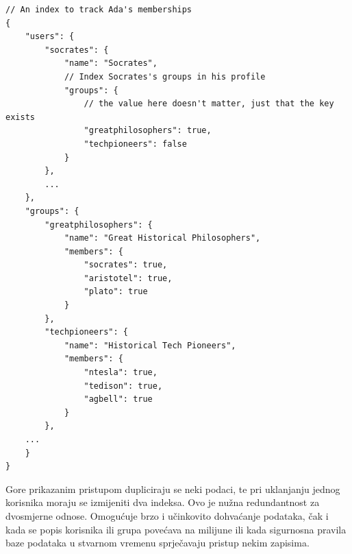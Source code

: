 \begin{lstlisting}[caption={Primjer kreiranja dva indeksa}]
// An index to track Ada's memberships
{
	"users": {
		"socrates": {
			"name": "Socrates",
			// Index Socrates's groups in his profile
			"groups": {
				// the value here doesn't matter, just that the key exists
				"greatphilosophers": true,
				"techpioneers": false
			}
		},
		...
	},
	"groups": {
		"greatphilosophers": {
			"name": "Great Historical Philosophers",
			"members": {
				"socrates": true,
				"aristotel": true,
				"plato": true
			}
		},
		"techpioneers": {
			"name": "Historical Tech Pioneers",
			"members": {
				"ntesla": true,
				"tedison": true,
				"agbell": true
			}
		},
	...
	}
}
\end{lstlisting}

Gore prikazanim pristupom dupliciraju se neki podaci, te pri uklanjanju jednog korisnika moraju se izmijeniti dva indeksa. Ovo je nužna redundantnost za dvosmjerne odnose. Omogućuje brzo i učinkovito dohvaćanje podataka, čak i kada se popis korisnika ili grupa povećava na milijune ili kada sigurnosna pravila baze podataka u stvarnom vremenu sprječavaju pristup nekim zapisima. 

\eject